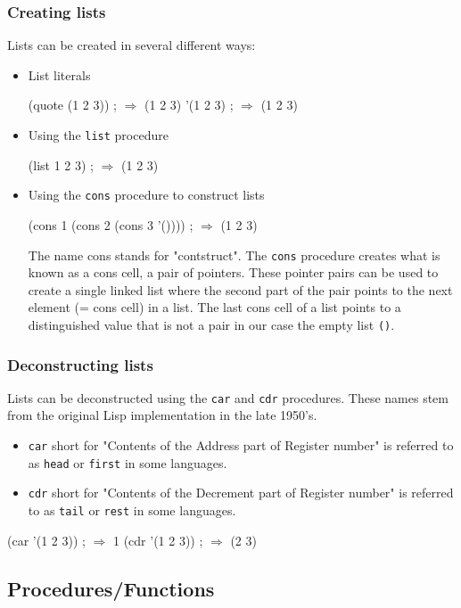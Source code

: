 \documentclass[12pt,a4paper,draft,twoside]{article}
\begin{document}
\subsubsection{Creating lists}
Lists can be created in several different ways:
\begin{itemize}
\item List literals 
\begin{schemecode}
(quote (1 2 3)) ; $\Rightarrow$ (1 2 3)
'(1 2 3) ; $\Rightarrow$ (1 2 3)
\end{schemecode}
\item Using the \texttt{list} procedure
\begin{schemecode}
(list 1 2 3) ; $\Rightarrow$ (1 2 3)
\end{schemecode}
\item Using the \texttt{cons} procedure to construct lists  
\begin{schemecode}
(cons 1 (cons 2 (cons 3 '()))) ; $\Rightarrow$ (1 2 3)
\end{schemecode}
The name cons stands for "contstruct". The \texttt{cons} procedure creates what is known as a cons cell, a pair of pointers. These pointer pairs can be used to create a single linked list where the second part of the pair points to the next element (= cons cell) in a list. The last cons cell of a list points to a distinguished value that is not a pair in our case the empty list \texttt{()}. 
\end{itemize}
\subsubsection{Deconstructing lists}
Lists can be deconstructed using the \texttt{car} and \texttt{cdr} procedures. These names stem from the original Lisp implementation in the late 1950's. 
\begin{itemize}
\item \texttt{car} short for "Contents of the Address part of Register number" is referred to as \texttt{head} or \texttt{first} in some languages.
\item \texttt{cdr} short for "Contents of the Decrement part of Register number" is referred to as \texttt{tail} or \texttt{rest} in some languages.
\end{itemize} 
\begin{schemecode}
(car '(1 2 3)) ; $\Rightarrow$ 1
(cdr '(1 2 3)) ; $\Rightarrow$ (2 3)
\end{schemecode}
\subsection{Procedures/Functions}
\end{document}
